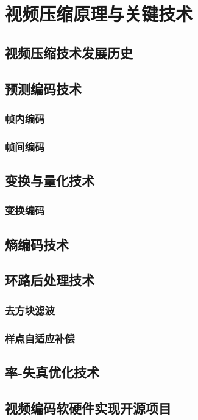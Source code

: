 \chapter{视频压缩原理与关键技术}
\label{cha:c2}

\section{视频压缩技术发展历史}

\section{预测编码技术}
\subsection{帧内编码}
\subsection{帧间编码}

\section{变换与量化技术}
\subsection{变换编码}

\section{熵编码技术}

\section{环路后处理技术}
\subsection{去方块滤波}
\subsection{样点自适应补偿}

\section{率-失真优化技术}

\section{视频编码软硬件实现开源项目}